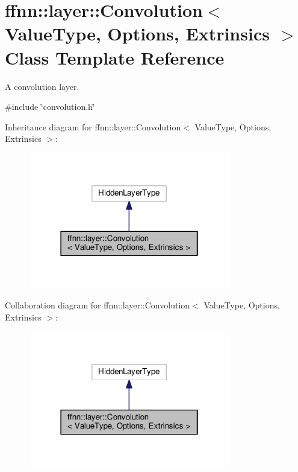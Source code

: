\hypertarget{classffnn_1_1layer_1_1_convolution}{\section{ffnn\-:\-:layer\-:\-:Convolution$<$ Value\-Type, Options, Extrinsics $>$ Class Template Reference}
\label{classffnn_1_1layer_1_1_convolution}
}


A convolution layer.  




{\ttfamily \#include \char`\"{}convolution.\-h\char`\"{}}



Inheritance diagram for ffnn\-:\-:layer\-:\-:Convolution$<$ Value\-Type, Options, Extrinsics $>$\-:
\nopagebreak
\begin{figure}[H]
\begin{center}
\leavevmode
\includegraphics[width=250pt]{classffnn_1_1layer_1_1_convolution__inherit__graph}
\end{center}
\end{figure}


Collaboration diagram for ffnn\-:\-:layer\-:\-:Convolution$<$ Value\-Type, Options, Extrinsics $>$\-:
\nopagebreak
\begin{figure}[H]
\begin{center}
\leavevmode
\includegraphics[width=250pt]{classffnn_1_1layer_1_1_convolution__coll__graph}
\end{center}
\end{figure}
